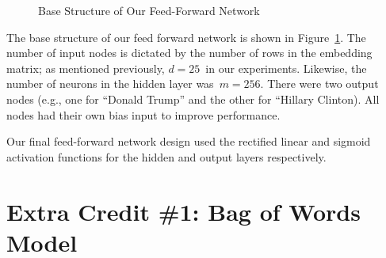 \documentclass{report}
\begin{document}
\begin{figure}
    \caption{Base Structure of Our Feed-Forward Network}\label{fig:feedForwardNet}
  \end{figure}
  
  The base structure of our feed forward network is shown in Figure~\ref{fig:feedForwardNet}.  The number of input nodes is dictated by the number of rows in the embedding matrix; as mentioned previously, $d=25$~in our experiments.  Likewise, the number of neurons in the hidden layer was~$m=256$. There were two output nodes (e.g., one for ``Donald Trump'' and the other for ``Hillary Clinton).  All nodes had their own bias input to improve performance.  
  
  Our final feed-forward network design used the rectified linear and sigmoid activation functions for the hidden and output layers respectively.
  
  
  \section{Extra Credit \#1: Bag of Words Model}
  
\end{document}
